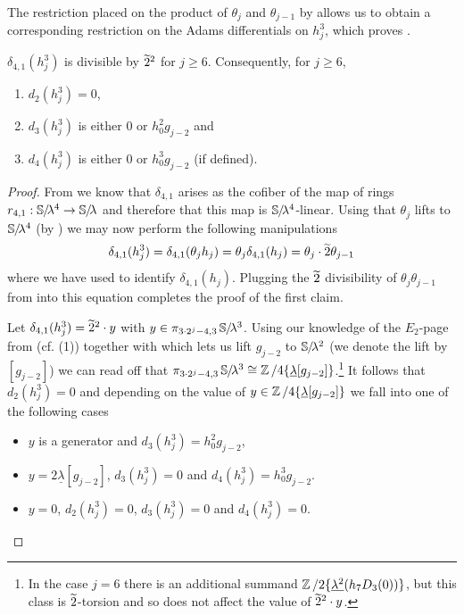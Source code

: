 The restriction placed on the product of $\theta_j$ and $\theta_{j-1}$ by  allows us to obtain a corresponding restriction on the Adams differentials on $h_j^3$, which proves .

\begin{prop} \label{prop:d4-divisible}
  $\delta_{4,1}(h_j^3)$ is divisible by $\wt{2}^2$ for $j \geq 6$.
  Consequently, for $j \geq 6$,
  \begin{enumerate}
  \item $d_2(h_j^3) = 0$,
  \item $d_3(h_j^3)$ is either $0$ or $h_0^2g_{j-2}$ and
  \item $d_4(h_j^3)$ is either $0$ or $h_0^3g_{j-2}$ (if defined).
  \end{enumerate}  
\end{prop}

\begin{proof}
  From  we know that $\delta_{4,1}$ arises as the cofiber of the map of rings $r_{4,1} : \operatorname{\mathbb{S}}\hspace{-2.2pt}/\!\lambda^4 \to \operatorname{\mathbb{S}}\hspace{-2.2pt}/\!\lambda$ and therefore that this map is $\operatorname{\mathbb{S}}\hspace{-2.2pt}/\!\lambda^4$-linear. Using that $\theta_j$ lifts to $\operatorname{\mathbb{S}}\hspace{-2.2pt}/\!\lambda^4$ (by ) we may now perform the following manipulations
  \begin{align} 
    \delta_{4,1}( h_j^3 ) = \delta_{4,1}( \theta_j h_j ) = \theta_j \delta_{4,1}(h_j) = \theta_j \cdot \wt{2} \theta_{j-1} \label{eqn:test}
  \end{align}
  where we have used  to identify $\delta_{4,1}(h_j)$.
  Plugging the $\wt{2}$ divisibility of $\theta_j\theta_{j-1}$ from 
  into this equation completes the proof of the first claim.

  Let $\delta_{4,1}(h_j^3) = \wt{2}^2 \cdot y$ with $y \in \pi_{ 3 \cdot 2^j - 4, 3}\operatorname{\mathbb{S}}\hspace{-2.2pt}/\!\lambda^3$.
  Using our knowledge of the $E_2$-page from \cite{Ext5} (cf. (1)) together with  which lets us lift $g_{j-2}$ to $\operatorname{\mathbb{S}}\hspace{-2.2pt}/\!\lambda^2$ (we denote the lift by $[g_{j-2}]$) we can read off that
  $\pi_{ 3 \cdot 2^j - 4, 3}\operatorname{\mathbb{S}}\hspace{-2.2pt}/\!\lambda^3 \cong \operatorname{\mathbb{Z}}/4\{\underline{\lambda}[g_{j-2}]\}$.\footnote{In the case $j=6$ there is an additional summand $\operatorname{\mathbb{Z}}/2\{\underline{\lambda^2}(h_7D_3(0))\}$, but this class is $\wt{2}$-torsion and so does not affect the value of $\wt{2}^2 \cdot y$.}
  It follows that $d_2(h_j^3) = 0$ and depending on the value of $y \in \operatorname{\mathbb{Z}}/4\{\underline{\lambda}[g_{j-2}]\}$ we fall into one of the following cases
  \begin{itemize}
  \item[(a)] $y$ is a generator and $d_3(h_j^3) = h_0^2g_{j-2}$,
  \item[(b)] $y = 2\underline{\lambda}[g_{j-2}]$, $d_3(h_j^3) = 0$ and $d_4(h_j^3) = h_0^3g_{j-2}$.
  \item[(c)] $y = 0$, $d_2(h_j^3) = 0$, $d_3(h_j^3) = 0$ and $d_4(h_j^3) = 0$.
  \end{itemize}
\end{proof}

